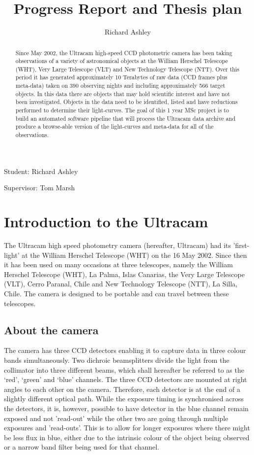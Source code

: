 \documentclass[a4paper,10pt]{article}
\begin{document}
\title{Progress Report and Thesis plan}
\author{Richard Ashley}
\maketitle
\begin{flushright}
Student: Richard Ashley

Supervisor: Tom Marsh
\end{flushright}

\begin{abstract} 
Since May 2002, the  Ultracam high-speed CCD photometric camera has been taking observations of a variety of astronomical objects at the William Herschel Telescope (WHT), Very Large Telescope (VLT) and New Technology Telescope (NTT). Over this period it has generated approximately 10 Terabytes of raw data (CCD frames plus meta-data) taken on 390 observing nights and including 
approximately 566 target objects. In this data there are objects that may hold scientific interest and have not been investigated. 
Objects in the data need to be identified, listed and have reductions performed to determine their light-curves. The goal of 
this 1 year MSc project is to build an automated software pipeline that will process the Ultracam data archive and produce a browse-able 
version of the light-curves and meta-data for all of the observations. 
\end{abstract}

\section{Introduction to the Ultracam} 

The Ultracam high speed photometry camera (hereafter, Ultracam) had its 'first-light' at the William Herschel Telescope (WHT) on the 16 May 2002. Since then it has been used on many occasions at three telescopes, namely the William Herschel Telescope (WHT), La Palma, Islas Canarias, the Very Large Telescope (VLT), Cerro Paranal, Chile and New Technology Telescope (NTT), La Silla, Chile. The camera is designed to be portable and can travel between these telescopes. 

\subsection{About the camera}
The camera has three CCD detectors enabling it to capture data in three colour bands simultaneously. Two dichroic beamsplitters divide the light from the collimator into three different beams, which shall hereafter be referred to as the ‘red’, ‘green’ and ‘blue’ channels. The three CCD detectors are mounted at right angles to each other on the camera. Therefore, each detector is at the end of a slightly different optical path. While the exposure timing is synchronised across the detectors, it is, however, possible to have detector in the blue channel remain exposed and not 'read-out' while the other two are going through multiple exposures and 'read-outs'. This is to allow for longer exposures where there might be less flux in blue, either due to the intrinsic colour of the object being observed or a narrow band filter being used for that channel. 
\end{document}
